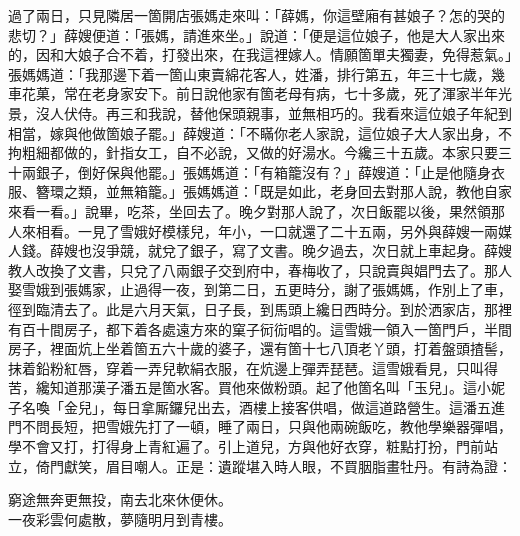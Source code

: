 過了兩日，只見隣居一箇開店張媽走來叫：「薛媽，你這壁廂有甚娘子？怎的哭的悲切？」薛嫂便道：「張媽，請進來坐。」說道：「便是這位娘子，他是大人家出來的，因和大娘子合不着，打發出來，在我這裡嫁人。情願箇單夫獨妻，免得惹氣。」張媽媽道：「我那邊下着一箇山東賣綿花客人，姓潘，排行第五，年三十七歲，幾車花菓，常在老身家安下。前日說他家有箇老母有病，七十多歲，死了渾家半年光景，沒人伏侍。再三和我說，替他保頭親事，並無相巧的。我看來這位娘子年紀到相當，嫁與他做箇娘子罷。」薛嫂道：「不瞞你老人家說，這位娘子大人家出身，不拘粗細都做的，針指女工，自不必說，又做的好湯水。今纔三十五歲。本家只要三十兩銀子，倒好保與他罷。」張媽媽道：「有箱籠沒有？」薛嫂道：「止是他隨身衣服、簪環之類，並無箱籠。」張媽媽道：「既是如此，老身回去對那人說，教他自家來看一看。」說畢，吃茶，坐回去了。晚夕對那人說了，次日飯罷以後，果然領那人來相看。一見了雪娥好模樣兒，年小，一口就還了二十五兩，另外與薛嫂一兩媒人錢。薛嫂也沒爭競，就兌了銀子，寫了文書。晚夕過去，次日就上車起身。薛嫂教人改換了文書，只兌了八兩銀子交到府中，春梅收了，只說賣與娼門去了。{}那人娶雪娥到張媽家，止過得一夜，到第二日，五更時分，謝了張媽媽，作別上了車，徑到臨清去了。此是六月天氣，日子長，到馬頭上纔日西時分。到於洒家店，那裡有百十間房子，都下着各處遠方來的窠子衏䘕唱的。這雪娥一領入一箇門戶，半間房子，裡面炕上坐着箇五六十歲的婆子，還有箇十七八頂老丫頭，打着盤頭揸髻，抹着鉛粉紅唇，穿着一弄兒軟絹衣服，在炕邊上彈弄琵琶。這雪娥看見，只叫得苦，纔知道那漢子潘五是箇水客。買他來做粉頭。起了他箇名叫「玉兒」。這小妮子名喚「金兒」，每日拿厮鑼兒出去，酒樓上接客供唱，做這道路營生。這潘五進門不問長短，把雪娥先打了一頓，睡了兩日，只與他兩碗飯吃，{}教他學樂器彈唱，學不會又打，打得身上青紅遍了。引上道兒，方與他好衣穿，粧點打扮，門前站立，倚門獻笑，眉目嘲人。正是：遺蹤堪入時人眼，不買胭脂畫牡丹。有詩為證：

\begin{myquote}
窮途無奔更無投，南去北來休便休。\\一夜彩雲何處散，夢隨明月到青樓。
\end{myquote}

